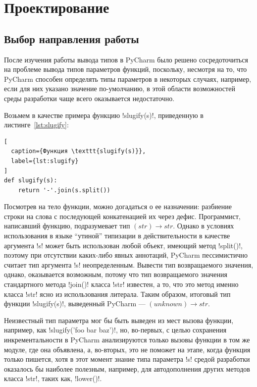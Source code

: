 \chapter{Проектирование}
\label{sec:designing}

\section{Выбор направления работы}
\label{sec:work-direction}

После изучения работы вывода типов в PyCharm было решено сосредоточиться на
проблеме вывода типов параметров функций, поскольку, несмотря на то, что PyCharm
способен определять типы параметров в некоторых случаях, например, если для них
указано значение по-умолчанию, в этой области возможностей среды разработки чаще
всего оказывается недостаточно.

Возьмем в качестве примера функцию !slugify(s)!, приведенную в
листинге~\ref{lst:slugify}:

\begin{lstlisting}[
  caption={Функция \texttt{slugify(s)}},
  label={lst:slugify}
]
def slugify(s):
    return '-'.join(s.split())
\end{lstlisting}

Посмотрев на тело функции, можно догадаться о ее назначении: разбиение строки на
слова с последующей конкатенацией их через дефис. Программист, написавший
функцию, подразумевает тип $(str) \rightarrow str$. Однако в условиях
использования в языке ``утиной'' типизации в действительности в качестве
аргумента !s! может быть использован любой объект, имеющий метод !split()!,
поэтому при отсутствии каких-либо явных аннотаций, PyCharm пессимистично считает
тип аргумента !s!  неопределенным.  Вывести тип возвращаемого значения, однако,
оказывается возможным, потому что тип возвращаемого значения стандартного метода
!join()! класса !str! известен, а то, что это метод именно класса !str! ясно из
использования литерала.  Таким образом, итоговый тип функции !slugify(s)!,
выведенный PyCharm --- $(unknown) \rightarrow str$.

Неизвестный тип параметра мог бы быть выведен из мест вызова функции, например, 
как !slugify('foo bar baz')!, но, во-первых, с целью сохранения
инкрементальности в PyCharm анализируются только вызовы функции в том же модуле,
где она объявлена, а, во-вторых, это не поможет на этапе, когда функция только
пишется, хотя в этот момент знание типа параметра !s! средой разработки
оказалось бы наиболее полезным, например, для автодополнения других методов
класса !str!, таких как, !lower()!.

